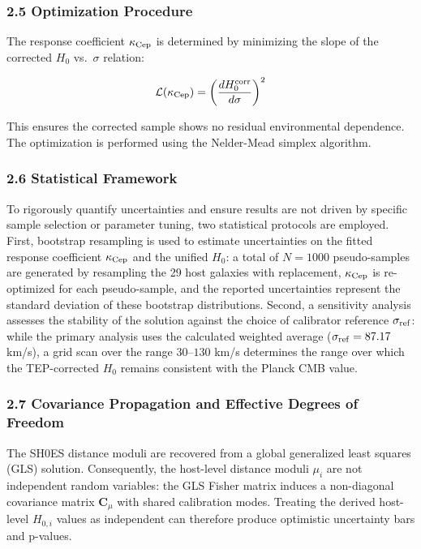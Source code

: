 \documentclass[
]{article}
\begin{document}
\subsubsection{2.5 Optimization Procedure}\label{optimization-procedure}

The response coefficient \(\kappa_{\rm Cep}\) is determined by
minimizing the slope of the corrected \(H_0\) vs.~\(\sigma\) relation:

\begin{equation}
\mathcal{L}(\kappa_{\rm Cep}) = \left(\frac{dH_0^{\rm corr}}{d\sigma}\right)^2
\end{equation}

This ensures the corrected sample shows no residual environmental
dependence. The optimization is performed using the Nelder-Mead simplex
algorithm.

\subsubsection{2.6 Statistical Framework}\label{statistical-framework}

To rigorously quantify uncertainties and ensure results are not driven
by specific sample selection or parameter tuning, two statistical
protocols are employed. First, bootstrap resampling is used to estimate
uncertainties on the fitted response coefficient \(\kappa_{\rm Cep}\)
and the unified \(H_0\): a total of \(N=1000\) pseudo-samples are
generated by resampling the 29 host galaxies with replacement,
\(\kappa_{\rm Cep}\) is re-optimized for each pseudo-sample, and the
reported uncertainties represent the standard deviation of these
bootstrap distributions. Second, a sensitivity analysis assesses the
stability of the solution against the choice of calibrator reference
\(\sigma_{\rm ref}\): while the primary analysis uses the calculated
weighted average (\(\sigma_{\rm ref} = 87.17\) km/s), a grid scan over
the range \(30\)--\(130\) km/s determines the range over which the
TEP-corrected \(H_0\) remains consistent with the Planck CMB value.

\subsubsection{2.7 Covariance Propagation and Effective Degrees of
Freedom}\label{covariance-propagation-and-effective-degrees-of-freedom}

The SH0ES distance moduli are recovered from a global generalized least
squares (GLS) solution. Consequently, the host-level distance moduli
\(\mu_i\) are not independent random variables: the GLS Fisher matrix
induces a non-diagonal covariance matrix \(\mathbf{C}_{\mu}\) with
shared calibration modes. Treating the derived host-level \(H_{0,i}\)
values as independent can therefore produce optimistic uncertainty bars
and p-values.
\end{document}
